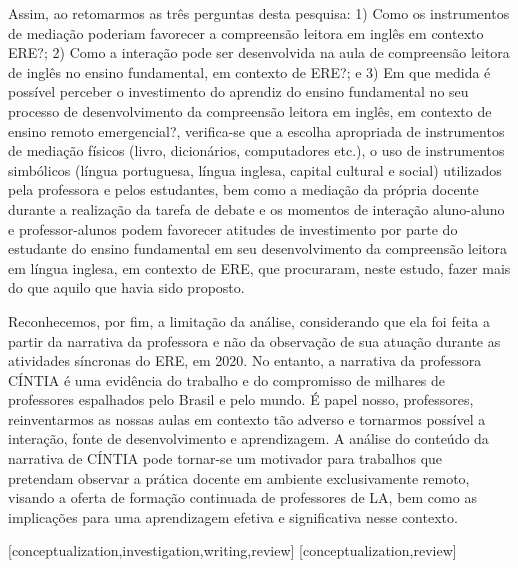 \documentclass{textolivre}
\begin{document}
Assim, ao retomarmos as três perguntas desta pesquisa: 1) Como os instrumentos de mediação poderiam favorecer a compreensão leitora em inglês em contexto ERE?; 2) Como a interação pode ser desenvolvida na aula de compreensão leitora de inglês no ensino fundamental, em contexto de ERE?; e 3) Em que medida é possível perceber o investimento \cite{darvin2016, norton2013} do aprendiz do ensino fundamental no seu processo de desenvolvimento da compreensão leitora em inglês, em contexto de ensino remoto emergencial?, verifica-se que a escolha apropriada de instrumentos de mediação físicos (livro, dicionários, computadores etc.), o uso de instrumentos simbólicos (língua portuguesa, língua inglesa, capital cultural e social) utilizados pela professora e pelos estudantes, bem como a mediação da própria docente durante a realização da tarefa de debate e os momentos de interação aluno-aluno e professor-alunos podem favorecer atitudes de investimento por parte do estudante do ensino fundamental em seu desenvolvimento da compreensão leitora em língua inglesa, em contexto de ERE, que procuraram, neste estudo, fazer mais do que aquilo que havia sido proposto.  

Reconhecemos, por fim, a limitação da análise, considerando que ela foi feita a partir da narrativa da professora e não da observação de sua atuação durante as atividades síncronas do ERE, em 2020. No entanto, a narrativa da professora CÍNTIA é uma evidência do trabalho e do compromisso de milhares de professores espalhados pelo Brasil e pelo mundo. É papel nosso, professores, reinventarmos as nossas aulas em contexto tão adverso e tornarmos possível a interação, fonte de desenvolvimento e aprendizagem. A análise do conteúdo da narrativa de CÍNTIA pode tornar-se um motivador para trabalhos que pretendam observar a prática docente em ambiente exclusivamente remoto, visando a oferta de formação continuada de professores de LA, bem como as implicações para uma aprendizagem efetiva e significativa nesse contexto.

\printbibliography\label{sec-bib}

\begin{contributors}
[conceptualization,investigation,writing,review]
[conceptualization,review]
\end{contributors}
\end{document}
